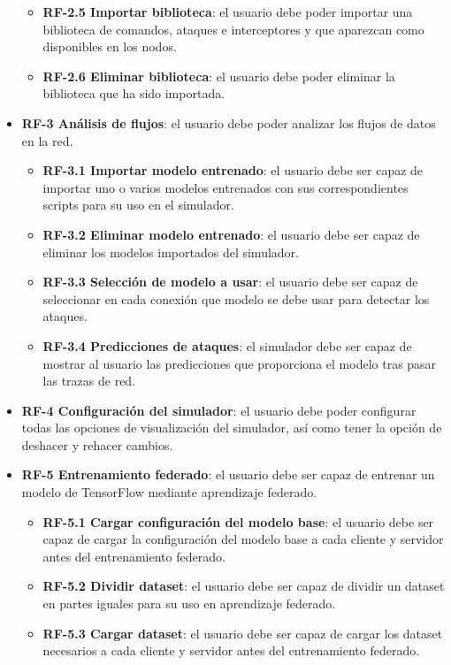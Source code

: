 \begin{itemize}
\begin{itemize}
        \item \textbf{RF-2.5 Importar biblioteca}: el usuario debe poder importar una biblioteca de comandos, ataques e interceptores y que aparezcan como disponibles en los nodos.
        \item \textbf{RF-2.6 Eliminar biblioteca}: el usuario debe poder eliminar la biblioteca que ha sido importada.
    \end{itemize}
    \item \textbf{RF-3 Análisis de flujos}: el usuario debe poder analizar los flujos de datos en la red.
    \begin{itemize}
        \item \textbf{RF-3.1 Importar modelo entrenado}: el usuario debe ser capaz de importar uno o varios modelos entrenados con sus correspondientes scripts para su uso en el simulador.
        \item \textbf{RF-3.2 Eliminar modelo entrenado}: el usuario debe ser capaz de eliminar los modelos importados del simulador.
        \item \textbf{RF-3.3 Selección de modelo a usar}: el usuario debe ser capaz de seleccionar en cada conexión que modelo se debe usar para detectar los ataques.
        \item \textbf{RF-3.4 Predicciones de ataques}: el simulador debe ser capaz de mostrar al usuario las predicciones que proporciona el modelo tras pasar las trazas de red.
    \end{itemize}
    \item \textbf{RF-4 Configuración del simulador}: el usuario debe poder configurar todas las opciones de visualización del simulador, así como tener la opción de deshacer y rehacer cambios.    
    \item \textbf{RF-5 Entrenamiento federado}: el usuario debe ser capaz de entrenar un modelo de TensorFlow mediante aprendizaje federado.
    \begin{itemize}
         \item \textbf{RF-5.1 Cargar configuración del modelo base}: el usuario debe ser capaz de cargar la configuración del modelo base a cada cliente y servidor antes del entrenamiento federado.
        \item \textbf{RF-5.2 Dividir dataset}: el usuario debe ser capaz de dividir un dataset en partes iguales para su uso en aprendizaje federado.
        \item \textbf{RF-5.3 Cargar dataset}: el usuario debe ser capaz de cargar los dataset necesarios a cada cliente y servidor antes del entrenamiento federado.

\end{itemize}
\end{itemize}
